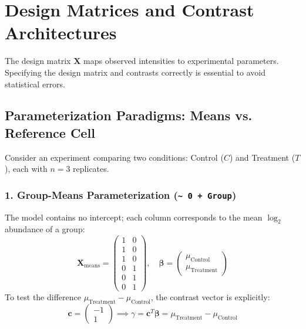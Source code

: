 \documentclass[11pt,twoside,openright]{book}
\begin{document}
\section{Design Matrices and Contrast Architectures}

The design matrix $\mathbf{X}$ maps observed intensities to experimental parameters. Specifying the design matrix and contrasts correctly is essential to avoid statistical errors.

\subsection{Parameterization Paradigms: Means vs. Reference Cell}

Consider an experiment comparing two conditions: Control ($C$) and Treatment ($T$), each with $n = 3$ replicates.

\subsubsection{1. Group-Means Parameterization (\texttt{\~{} 0 + Group})}
The model contains no intercept; each column corresponds to the mean $\log_2$ abundance of a group:
\begin{equation}
\mathbf{X}_{\text{means}} = \begin{pmatrix}
1 & 0 \\
1 & 0 \\
1 & 0 \\
0 & 1 \\
0 & 1 \\
0 & 1
\end{pmatrix}, \quad 
\boldsymbol{\beta} = \begin{pmatrix} \mu_{\text{Control}} \\ \mu_{\text{Treatment}} \end{pmatrix}
\end{equation}
To test the difference $\mu_{\text{Treatment}} - \mu_{\text{Control}}$, the contrast vector is explicitly:
\begin{equation}
\mathbf{c} = \begin{pmatrix} -1 \\ 1 \end{pmatrix} \implies \gamma = \mathbf{c}^T \boldsymbol{\beta} = \mu_{\text{Treatment}} - \mu_{\text{Control}}
\end{equation}
\end{document}
